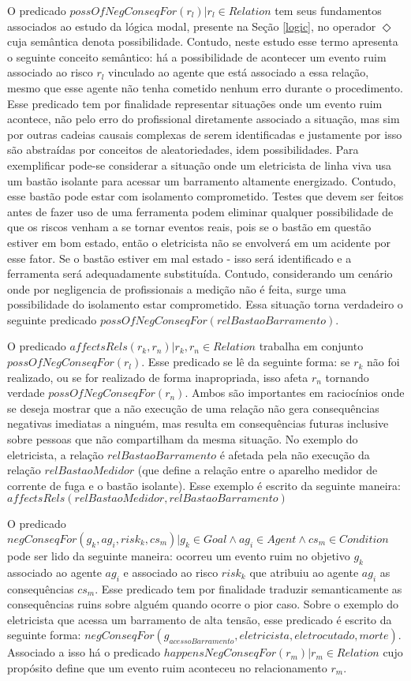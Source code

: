 O predicado $possOfNegConseqFor(r_l) | r_l \in Relation $ tem seus fundamentos associados ao estudo da lógica modal, presente na Seção \ref{logic}, no operador $\Diamond$ cuja semântica denota possibilidade. Contudo, neste estudo esse termo apresenta o seguinte conceito semântico: há a possibilidade de acontecer um evento ruim associado ao risco $r_l$ vinculado ao agente que está associado a essa relação, mesmo que esse agente não tenha cometido nenhum erro durante o procedimento. Esse predicado tem por finalidade representar situações onde um evento ruim acontece, não pelo erro do profissional diretamente associado a situação, mas sim por outras cadeias causais complexas de serem identificadas e justamente por isso são abstraídas por conceitos de aleatoriedades, idem possibilidades. Para exemplificar pode-se considerar a situação onde um eletricista de linha viva usa um bastão isolante para acessar um barramento altamente energizado. Contudo, esse bastão pode estar com isolamento comprometido. Testes que devem ser feitos antes de fazer uso de uma ferramenta podem eliminar qualquer possibilidade de que os riscos venham a se tornar eventos reais, pois se o bastão em questão estiver em bom estado, então o eletricista não se envolverá em um acidente por esse fator. Se o bastão estiver em mal estado - isso será identificado e a ferramenta será adequadamente substituída. Contudo, considerando um cenário onde por negligencia de profissionais a medição não é feita, surge uma possibilidade do isolamento estar comprometido. Essa situação torna verdadeiro o seguinte predicado $possOfNegConseqFor(relBastaoBarramento)$.

O predicado $affectsRels(r_k,r_n) |  r_k, r_n  \in Relation $ trabalha em conjunto $possOfNegConseqFor(r_l)$. Esse predicado se lê da seguinte forma: se $r_k$ não foi realizado, ou se for realizado de forma inapropriada, isso afeta  $r_n$ tornando verdade $possOfNegConseqFor(r_n)$. Ambos são importantes em raciocínios onde se deseja mostrar que a não execução de uma relação não gera consequências negativas imediatas a ninguém, mas resulta em consequências futuras inclusive sobre pessoas que não compartilham da mesma situação. No exemplo do eletricista, a relação $relBastaoBarramento$ é afetada pela não execução da relação $relBastaoMedidor$ (que define a relação entre o aparelho medidor de corrente de fuga e o bastão isolante). Esse exemplo é escrito da seguinte maneira:$affectsRels(relBastaoMedidor,relBastaoBarramento)$

O predicado $negConseqFor(g_k, ag_i,risk_k,cs_m) | g_k \in Goal \wedge ag_i \in Agent \wedge cs_m \in Condition $ pode ser lido da seguinte maneira: ocorreu um evento ruim no objetivo $g_k$ associado ao agente $ag_i$ e associado ao risco $risk_k$ que atribuiu ao agente $ag_i$ as consequências $cs_m$. Esse predicado tem por finalidade traduzir semanticamente as consequências ruins sobre alguém quando ocorre o pior caso. Sobre o exemplo do eletricista que acessa um barramento de alta tensão, esse predicado é escrito da seguinte forma: $negConseqFor(g_{acessoBarramento}, eletricista,eletrocutado,morte)$. Associado a isso há o predicado $happensNegConseqFor(r_m) | r_m \in Relation $ cujo propósito define que um evento ruim aconteceu no relacionamento $r_m$.

